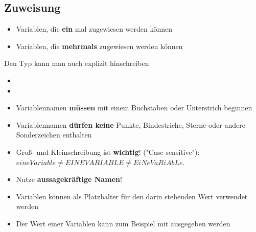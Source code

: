 \subsection{Zuweisung}
\begin{frame}
    \slidehead
    \begin{itemize}
        \item Variablen, die \textbf{ein} mal zugewiesen werden können\\
        \pause
        \vspace{1em}
        \item Variablen, die \textbf{mehrmals} zugewiesen werden können\\
        \pause
    \end{itemize}
    \pause
\end{frame}

\begin{frame}
    \slidehead
    Den Typ kann man auch explizit hinschreiben
    \vspace{1em}
    \begin{itemize}
        \item {}
        \vspace{1em}
        \item {}
    \end{itemize}
    \pause
\end{frame}

\begin{frame}
    \slidehead

    \begin{itemize}
        \item Variablennamen \textbf{müssen} mit einem Buchstaben oder Unterstrich beginnen
        \item Variablennamen \textbf{dürfen keine} Punkte, Bindestriche, Sterne oder andere Sonderzeichen enthalten
            \pause
        \item Groß- und Kleinschreibung ist \textbf{wichtig}! ("Case sensitive"):\\ $eineVariable \neq EINEVARIABLE \neq EiNeVaRiAbLe$.
            \pause
        \item Nutze \textbf{aussagekräftige Namen}!
            \pause
        \item Variablen können als Platzhalter für den darin stehenden Wert verwendet werden
        \item Der Wert einer Variablen kann zum Beispiel mit  ausgegeben werden
    \end{itemize}
\end{frame}

